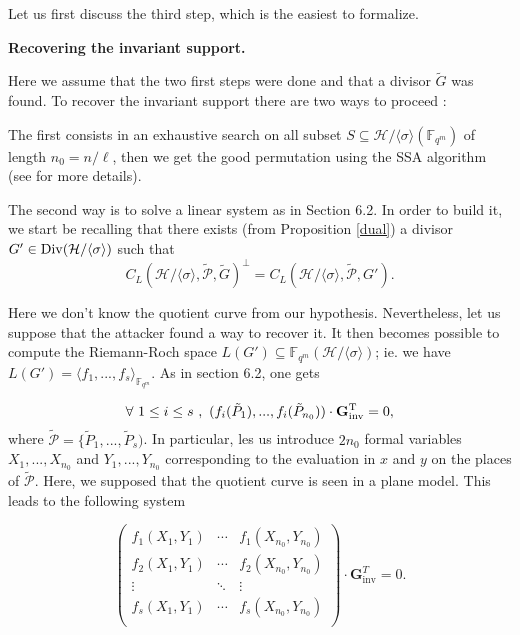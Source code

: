 \documentclass[10pt]{article}
\newcommand{\s}{\vspace{0.3cm}}
\newcommand{\cd}{\cdot}
\newcommand{\fqm}{\mathbb{F}_{q^m}}
\newcommand{\su}{\subseteq}
\newcommand{\PR}{\mathcal{P}}
\newcommand{\Div}{\operatorname{Div}}
\begin{document}
Let us first discuss the third step, which is the easiest to formalize.

\newpage

\textbf{Recovering the invariant support.}

\s

Here we assume that the two first steps were done and that a divisor $\tilde{G}$ was found. To recover the invariant support there are two ways to proceed :

\s

The first consists in an exhaustive search on all subset $S \su \mathcal{H}/\langle \sigma \rangle\left(\fqm\right)$ of length $n_0=n/\ell$, then we get the good permutation using the SSA algorithm (see \cite{SSA} for more details).

\s

The second way is to solve a linear system as in Section 6.2. In order to build it, we start be recalling that there exists (from Proposition \ref{dual}) a divisor $G' \in \rm \Div \it (\mathcal{H}/\langle \sigma \rangle)$ such that 
\[ C_L(\mathcal{H}/\langle \sigma \rangle,\tilde{\PR},\tilde{G})^{\perp} = C_L(\mathcal{H}/\langle \sigma \rangle,\tilde{\PR},G').\]

Here we don't know the quotient curve from our hypothesis. Nevertheless, let us suppose that the attacker found a way to recover it. It then becomes possible to compute the Riemann-Roch space $L(G') \su \fqm(\mathcal{H}/\langle \sigma \rangle)$;
ie. we have $L(G') = \langle f_1,...,f_s \rangle_{\fqm}$. As in section 6.2, one gets 

\begin{equation*}
\forall \ 1 \leq i \leq s \ , \ (f_i(\tilde{P}_1),...,f_i(\tilde{P}_{n_0})) \cd \bf{G}\rm ^T_{inv} = 0,
\end{equation*}
where $\tilde{\PR} = \{\tilde{P}_1,...,\tilde{P}_s)$. In particular, les us introduce $2n_0$ formal variables $X_1,...,X_{n_0}$ and $Y_1,...,Y_{n_0}$ corresponding to the evaluation in $x$ and $y$ on the places of $\tilde{\PR}$. Here, we supposed that the quotient curve is seen in a plane model. This leads to the following system

\begin{equation*}
\begin{pmatrix}
f_1(X_1,Y_1) & \cdots & f_1(X_{n_0},Y_{n_0}) \\
f_2(X_1,Y_1) & \cdots & f_2(X_{n_0},Y_{n_0}) \\
\vdots & \ddots & \vdots \\
f_s(X_1,Y_1) & \cdots & f_s(X_{n_0},Y_{n_0}) \\
\end{pmatrix}
\cd \mathbf{G}_{\mathrm{inv}}^T = 0.
\end{equation*}
\end{document}
